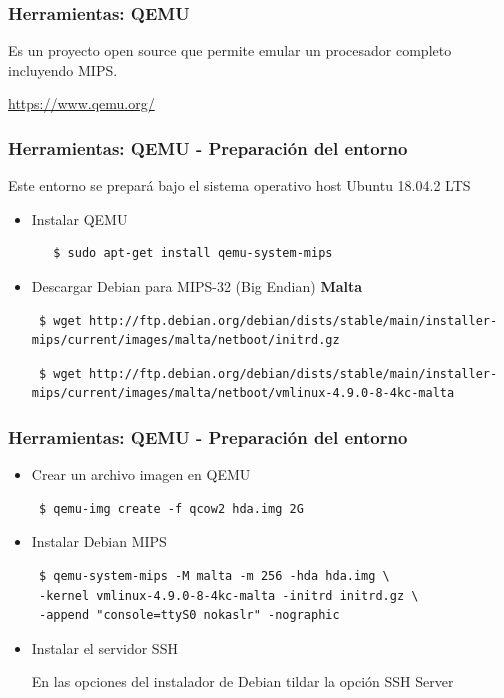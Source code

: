 \documentclass{beamer}
\begin{document}
  \begin{frame}
 \frametitle{Herramientas: QEMU}
Es un proyecto open source que permite emular un procesador completo incluyendo MIPS.

\url{https://www.qemu.org/}
  \end{frame}

  \begin{frame}[fragile]
 \frametitle{Herramientas: QEMU - Preparación del entorno}
Este entorno se prepará bajo el sistema operativo host Ubuntu 18.04.2 LTS

 \begin{itemize}
  \item Instalar QEMU
  \begin{verbatim}
   $ sudo apt-get install qemu-system-mips
  \end{verbatim}
\item Descargar Debian para MIPS-32 (Big Endian) \textbf{Malta}
\begin{lstlisting}
 $ wget http://ftp.debian.org/debian/dists/stable/main/installer-mips/current/images/malta/netboot/initrd.gz
\end{lstlisting}

\begin{lstlisting}
 $ wget http://ftp.debian.org/debian/dists/stable/main/installer-mips/current/images/malta/netboot/vmlinux-4.9.0-8-4kc-malta
\end{lstlisting}
\end{itemize}
  \end{frame}
  
 \begin{frame}[fragile]
 \frametitle{Herramientas: QEMU - Preparación del entorno}
 \begin{itemize}
  \item Crear un archivo imagen en QEMU
\begin{lstlisting}
 $ qemu-img create -f qcow2 hda.img 2G
\end{lstlisting}
\item Instalar Debian MIPS
\begin{lstlisting}
 $ qemu-system-mips -M malta -m 256 -hda hda.img \
 -kernel vmlinux-4.9.0-8-4kc-malta -initrd initrd.gz \
 -append "console=ttyS0 nokaslr" -nographic
\end{lstlisting}
\item Instalar el servidor SSH

En las opciones del instalador de Debian tildar la opción SSH Server
\end{itemize}
  \end{frame}
\end{document}
